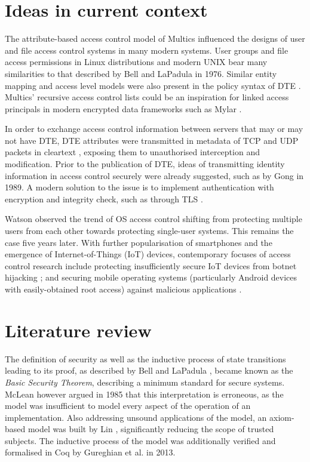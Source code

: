 \documentclass[11pt]{article}
\begin{document}
\section{Ideas in current context}

The attribute-based access control model of Multics influenced the designs of user and file access control systems in many modern systems. User groups and file access permissions in Linux distributions \cite{linuxpermissions} and modern UNIX bear many similarities to that described by Bell and LaPadula in 1976. Similar entity mapping and access level models were also present in the policy syntax of DTE \cite[Fig. 3]{badger1996domain}. Multics' recursive access control lists could be an inspiration for linked access principals in modern encrypted data frameworks such as Mylar \cite[Fig. 3]{popa2014building}. 

In order to exchange access control information between servers that may or may not have DTE, DTE attributes were transmitted in metadata of TCP and UDP packets in cleartext \cite[pp. 60-62]{badger1996domain}, exposing them to unauthorised interception and modification. Prior to the publication of DTE, ideas of transmitting identity information in access control securely were already suggested, such as by Gong \cite{gong1989secure} in 1989. A modern solution to the issue is to implement authentication with encryption and integrity check, such as through TLS \cite{tls}.

Watson \cite[p. 53]{watson2013decade} observed the trend of OS access control shifting from protecting multiple users from each other towards protecting single-user systems. This remains the case five years later. With further popularisation of smartphones and the emergence of Internet-of-Things (IoT) devices, contemporary focuses of access control research include protecting insufficiently secure IoT devices from botnet hijacking \cite[p. 100]{khajuria2017cybersecurity}; and securing mobile operating systems (particularly Android devices with easily-obtained root access) against malicious applications \cite{tam2017evolution}.

\section{Literature review}

The definition of security as well as the inductive process of state transitions leading to its proof, as described by Bell and LaPadula \cite{bell1976secure}, became known as the \emph{Basic Security Theorem}, describing a minimum standard for secure systems. McLean \cite{mclean1985comment} however argued in 1985 that this interpretation is erroneous, as the model was insufficient to model every aspect of the operation of an implementation. Also addressing unsound applications of the model, an axiom-based model was built by Lin \cite{lin1993bell}, significantly reducing the scope of trusted subjects. The inductive process of the model was additionally verified and formalised in Coq by Gureghian et al. \cite{gureghian2003full} in 2013. 
\end{document}

